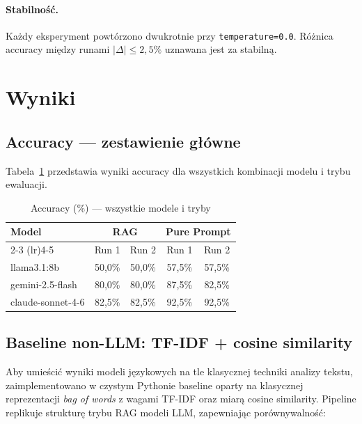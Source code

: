 \documentclass[12pt, a4paper]{article}
\begin{document}
\paragraph{Stabilność.}
Każdy eksperyment powtórzono dwukrotnie przy \texttt{temperature=0.0}.
Różnica accuracy między runami $|\Delta| \leq 2{,}5\%$ uznawana jest za stabilną.

\section{Wyniki}

\subsection{Accuracy — zestawienie główne}

Tabela~\ref{tab:main_results} przedstawia wyniki accuracy dla wszystkich kombinacji
modelu i trybu ewaluacji.

\begin{table}[H]
    \centering
    \caption{Accuracy (\%) — wszystkie modele i tryby}
    \label{tab:main_results}
    \begin{tabular}{@{}lcccc@{}}
        \toprule
        \multirow{2}{*}{\textbf{Model}}
            & \multicolumn{2}{c}{\textbf{RAG}}
            & \multicolumn{2}{c}{\textbf{Pure Prompt}} \\
        \cmidrule(lr){2-3} \cmidrule(lr){4-5}
            & Run 1 & Run 2 & Run 1 & Run 2 \\
        \midrule
        llama3.1:8b       & 50,0\% & 50,0\% & 57,5\% & 57,5\% \\
        gemini-2.5-flash  & 80,0\% & 80,0\% & 87,5\% & 82,5\% \\
        claude-sonnet-4-6 & 82,5\% & 82,5\% & 92,5\% & 92,5\% \\
        \bottomrule
    \end{tabular}
\end{table}

\subsection{Baseline non-LLM: TF-IDF + cosine similarity}
\label{sec:baseline}

Aby umieścić wyniki modeli językowych na tle klasycznej techniki analizy tekstu,
zaimplementowano w czystym Pythonie baseline oparty na klasycznej reprezentacji
\textit{bag of words} z wagami TF-IDF oraz miarą cosine similarity.
Pipeline replikuje strukturę trybu RAG modeli LLM,
zapewniając porównywalność:
\end{document}
